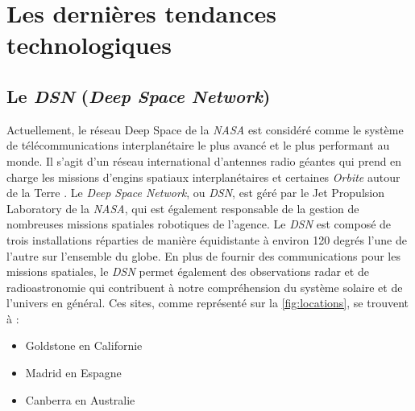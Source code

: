 \documentclass[conference]{IEEEtran}
\begin{document}
\section{Les dernières tendances technologiques}
\label{sec:DTT}
\subsection{Le \emph{DSN} (\emph{Deep Space Network})}
Actuellement, le réseau Deep Space de la \emph{NASA} est considéré comme le système de télécommunications interplanétaire le plus avancé et le plus performant au monde. Il s'agit d'un réseau international d'antennes radio géantes qui prend en charge les missions d'engins spatiaux interplanétaires et certaines \emph{Orbite} autour de la Terre \cite{b1}. Le \emph{Deep Space Network}, ou \emph{DSN}, est géré par le Jet Propulsion Laboratory de la \emph{NASA}, qui est également responsable de la gestion de nombreuses missions spatiales robotiques de l'agence.
Le \emph{DSN} est composé de trois installations réparties de manière équidistante à environ 120 degrés l'une de l'autre sur l'ensemble du globe. En plus de fournir des communications pour les missions spatiales, le \emph{DSN} permet également des observations radar et de radioastronomie qui contribuent à notre compréhension du système solaire et de l'univers en général.
\newline Ces sites, comme représenté sur la \autoref{fig:locations}, se trouvent à :
\begin{itemize}
\item Goldstone en Californie
\item Madrid en Espagne
\item Canberra en Australie
\end{itemize}
\end{document}
